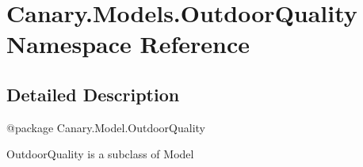 \hypertarget{namespace_canary_1_1_models_1_1_outdoor_quality}{\section{Canary.\-Models.\-Outdoor\-Quality Namespace Reference}
\label{namespace_canary_1_1_models_1_1_outdoor_quality}
}


\subsection{Detailed Description}
\begin{DoxyVerb}@package Canary.Model.OutdoorQuality

OutdoorQuality is a subclass of Model
\end{DoxyVerb}
 
